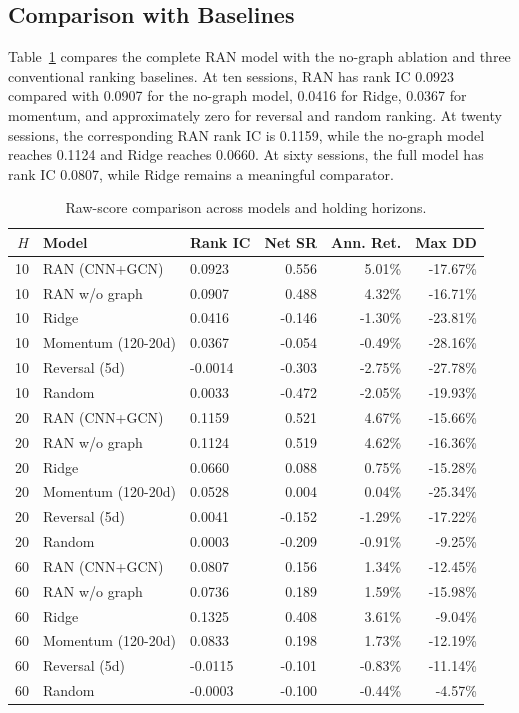 \documentclass[10pt]{article}
\begin{document}
\subsection{Comparison with Baselines}

Table~\ref{tab:comparison} compares the complete RAN model with the no-graph ablation and three conventional ranking baselines. At ten sessions, RAN has rank IC 0.0923 compared with 0.0907 for the no-graph model, 0.0416 for Ridge, 0.0367 for momentum, and approximately zero for reversal and random ranking. At twenty sessions, the corresponding RAN rank IC is 0.1159, while the no-graph model reaches 0.1124 and Ridge reaches 0.0660. At sixty sessions, the full model has rank IC 0.0807, while Ridge remains a meaningful comparator.

\begin{table}[tbp]
\centering
\small
\caption{Raw-score comparison across models and holding horizons.}
\label{tab:comparison}
\begin{tabular}{rllrrr}
\toprule
$H$ & Model & Rank IC & Net SR & Ann. Ret. & Max DD\\
\midrule
10 & RAN (CNN+GCN) & 0.0923 & 0.556 & 5.01\% & -17.67\% \\
10 & RAN w/o graph & 0.0907 & 0.488 & 4.32\% & -16.71\% \\
10 & Ridge & 0.0416 & -0.146 & -1.30\% & -23.81\% \\
10 & Momentum (120-20d) & 0.0367 & -0.054 & -0.49\% & -28.16\% \\
10 & Reversal (5d) & -0.0014 & -0.303 & -2.75\% & -27.78\% \\
10 & Random & 0.0033 & -0.472 & -2.05\% & -19.93\% \\
20 & RAN (CNN+GCN) & 0.1159 & 0.521 & 4.67\% & -15.66\% \\
20 & RAN w/o graph & 0.1124 & 0.519 & 4.62\% & -16.36\% \\
20 & Ridge & 0.0660 & 0.088 & 0.75\% & -15.28\% \\
20 & Momentum (120-20d) & 0.0528 & 0.004 & 0.04\% & -25.34\% \\
20 & Reversal (5d) & 0.0041 & -0.152 & -1.29\% & -17.22\% \\
20 & Random & 0.0003 & -0.209 & -0.91\% & -9.25\% \\
60 & RAN (CNN+GCN) & 0.0807 & 0.156 & 1.34\% & -12.45\% \\
60 & RAN w/o graph & 0.0736 & 0.189 & 1.59\% & -15.98\% \\
60 & Ridge & 0.1325 & 0.408 & 3.61\% & -9.04\% \\
60 & Momentum (120-20d) & 0.0833 & 0.198 & 1.73\% & -12.19\% \\
60 & Reversal (5d) & -0.0115 & -0.101 & -0.83\% & -11.14\% \\
60 & Random & -0.0003 & -0.100 & -0.44\% & -4.57\% \\
\bottomrule
\end{tabular}
\end{table}
\end{document}
